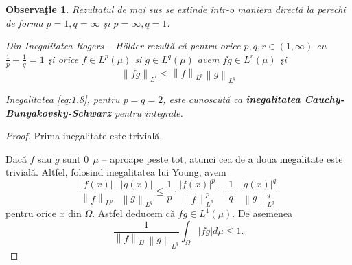 \documentclass[a4paper,12pt,oneside]{report}
\newtheorem{remark}{Observa\c{t}ie}
\begin{document}
\begin{remark}
	Rezultatul de mai sus se extinde \^{i}ntr-o maniera direct\u{a} la perechi de forma \(p = 1, q = \infty\) \c{s}i \(p = \infty, q = 1\).
	
Din Inegalitatea Rogers – Hölder rezult\u{a} c\u{a} pentru orice \(p, q, r \in \left ( 1 , \infty  \right )\) cu \(\frac{1}{p} + \frac{1}{q} = 1\) \c{s}i orice \(f\in L^{p}\left ( \mu  \right )\) si \(g\in L^{q}\left ( \mu  \right )\) avem \(fg\in L^{r}\left ( \mu  \right )\) \c{s}i
\begin{displaymath}
  \left \| fg \right \|_{L^{r}}\leq \left \| f \right \|_{L^{p}}\left \| g \right \|_{L^{q}} \label{eq:1.9} \tag{1.9}
\end{displaymath}


Inegalitatea \ref{eq:1.8}, pentru \(p = q = 2\), este cunoscut\u{a} ca \textbf{inegalitatea Cauchy-Bunyakovsky-Schwarz} pentru integrale.
\end{remark}
\begin{proof}
Prima inegalitate este trivial\u{a}.

Dac\u{a} \(f\) sau \(g\) sunt \(0~~ \mu\) – aproape peste tot, atunci cea de a doua inegalitate este trivial\u{a}. Altfel, folosind inegalitatea lui Young, avem
\begin{displaymath}
  \frac{\left | f\left ( x \right ) \right |}{\left \| f \right \|_{L^{p}}} \cdot \frac{\left | g\left ( x \right ) \right |}{\left \| g \right \|_{L^{q}}}\leq \frac{1}{p}\cdot \frac{\left | f\left ( x \right ) \right |^{p}}{\left \| f \right \|^{p}_{L^{p}}} + \frac{1}{q}\cdot \frac{\left | g\left ( x \right ) \right |^{q}}{\left \| g \right \|^{q}_{L^{q}}}
\end{displaymath}
 pentru orice \(x\) din \(\Omega\). Astfel deducem c\u{a} \(fg \in L^{1}\left ( \mu  \right )\). De asemenea
\begin{displaymath}
  \frac{1}{\left \| f \right \|_{L^{p}}\left \| g \right \|_{L^{q}}}\int_{\Omega }\left | fg \right |d\mu \leq 1.
\end{displaymath}
\end{proof}
\end{document}
